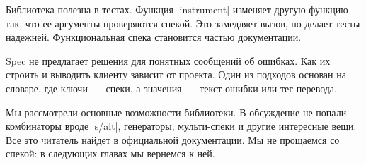 Библиотека полезна в тестах. Функция \spverb|instrument| изменяет другую функцию
так, что ее аргументы проверяются спекой. Это замедляет вызов, но делает тесты
надежней. Функциональная спека становится частью документации.

Spec не предлагает решения для понятных сообщений об ошибках. Как их строить и
выводить клиенту зависит от проекта. Один из подходов основан на словаре, где
ключи~--- спеки, а значения~--- текст ошибки или тег перевода.

Мы рассмотрели основные возможности библиотеки. В обсуждение не попали
комбинаторы вроде \spverb|s/alt|, генераторы, мульти-спеки и другие интересные
вещи. Все это читатель найдет в официальной документации. Мы не прощаемся со
спекой: в следующих главах мы вернемся к ней.
